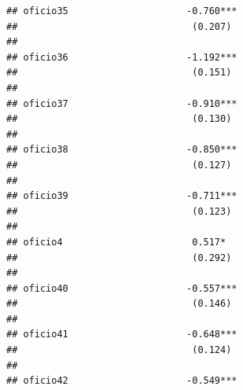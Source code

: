 \documentclass[
]{article}
\begin{document}
\begin{verbatim}
## oficio35                     -0.760***                                                              
##                               (0.207)                                                               
##                                                                                                     
## oficio36                     -1.192***                                                              
##                               (0.151)                                                               
##                                                                                                     
## oficio37                     -0.910***                                                              
##                               (0.130)                                                               
##                                                                                                     
## oficio38                     -0.850***                                                              
##                               (0.127)                                                               
##                                                                                                     
## oficio39                     -0.711***                                                              
##                               (0.123)                                                               
##                                                                                                     
## oficio4                       0.517*                                                                
##                               (0.292)                                                               
##                                                                                                     
## oficio40                     -0.557***                                                              
##                               (0.146)                                                               
##                                                                                                     
## oficio41                     -0.648***                                                              
##                               (0.124)                                                               
##                                                                                                     
## oficio42                     -0.549***                                                              

\end{verbatim}
\end{document}
